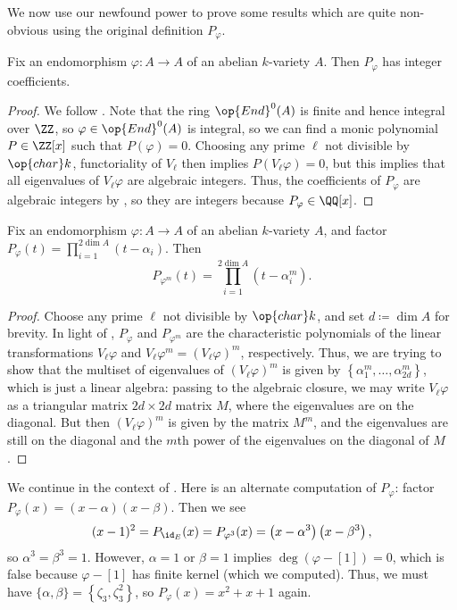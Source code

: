 \documentclass{amsart}
\begin{document}
We now use our newfound power to prove some results which are quite non-obvious using the original definition $P_\varphi$.
\begin{corollary} \label{cor:char-poly-coeffs-int}
	Fix an endomorphism $\varphi\colon A\to A$ of an abelian $k$-variety $A$. Then $P_\varphi$ has integer coefficients.
\end{corollary}
\begin{proof}
	We follow \cite[Corollary~12.10]{egm-av}. Note that the ring $\op{End}^0(A)$ is finite and hence integral over $\ZZ$, so $\varphi\in\op{End}^0(A)$ is integral, so we can find a monic polynomial $P\in\ZZ[x]$ such that $P(\varphi)=0$. Choosing any prime $\ell$ not divisible by $\op{char}k$, functoriality of $V_\ell$ then implies $P(V_\ell\varphi)=0$, but this implies that all eigenvalues of $V_\ell\varphi$ are algebraic integers. Thus, the coefficients of $P_\varphi$ are algebraic integers by , so they are integers because $P_\varphi\in\QQ[x]$.
\end{proof}
\begin{corollary} \label{cor:power-of-char-poly}
	Fix an endomorphism $\varphi\colon A\to A$ of an abelian $k$-variety $A$, and factor $P_\varphi(t)=\prod_{i=1}^{2\dim A}(t-\alpha_i)$. Then
	\[P_{\varphi^m}(t)=\prod_{i=1}^{2\dim A}\left(t-\alpha_i^m\right).\]
\end{corollary}
\begin{proof}
	Choose any prime $\ell$ not divisible by $\op{char}k$, and set $d\coloneqq\dim A$ for brevity. In light of , $P_\varphi$ and $P_{\varphi^m}$ are the characteristic polynomials of the linear transformations $V_\ell\varphi$ and $V_\ell\varphi^m=(V_\ell\varphi)^m$, respectively. Thus, we are trying to show that the multiset of eigenvalues of $(V_\ell\varphi)^m$ is given by $\left\{\alpha_1^m,\ldots,\alpha_{2d}^m\right\}$, which is just a linear algebra: passing to the algebraic closure, we may write $V_\ell\varphi$ as a triangular matrix $2d\times2d$ matrix $M$, where the eigenvalues are on the diagonal. But then $(V_\ell\varphi)^m$ is given by the matrix $M^m$, and the eigenvalues are still on the diagonal and the $m$th power of the eigenvalues on the diagonal of $M$.
\end{proof}
\begin{example}
	We continue in the context of . Here is an alternate computation of $P_\varphi$: factor $P_\varphi(x)=(x-\alpha)(x-\beta)$. Then we see
	\[(x-1)^2=P_{\id_E}(x)=P_{\varphi^3}(x)=\left(x-\alpha^3\right)\left(x-\beta^3\right),\]
	so $\alpha^3=\beta^3=1$. However, $\alpha=1$ or $\beta=1$ implies $\deg(\varphi-[1])=0$, which is false because $\varphi-[1]$ has finite kernel (which we computed). Thus, we must have $\{\alpha,\beta\}=\left\{\zeta_3,\zeta_3^2\right\}$, so $P_\varphi(x)=x^2+x+1$ again.
\end{example}
\end{document}
